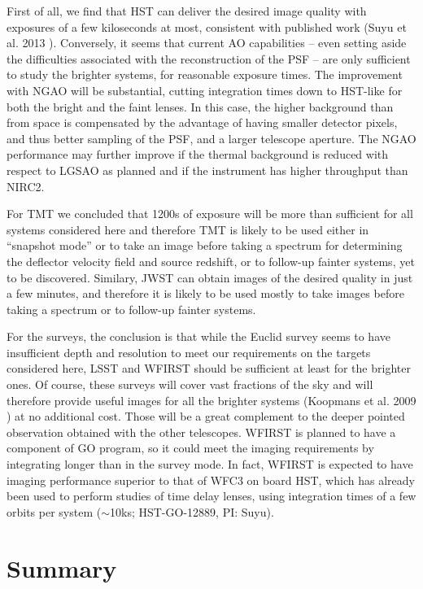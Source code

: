 \documentclass[a4paper,11pt]{article}
\begin{document}
{First of all, we find that HST can deliver the desired image quality
with exposures of a few kiloseconds at most, consistent with published work
(Suyu et al. 2013 \cite{2013ApJ...766...70S}). Conversely, it seems
that current AO capabilities -- even setting aside the difficulties
associated with the reconstruction of the PSF -- are only sufficient
to study the brighter systems, for reasonable exposure times. The
improvement with NGAO will be substantial, cutting integration times
down to HST-like for both the bright and the faint lenses. In this
case, the higher background than from space is compensated by the
advantage of having smaller detector pixels, and thus better sampling
of the PSF, and a larger telescope aperture. The NGAO performance may
further improve if the thermal background is reduced with respect to
LGSAO as planned and if the instrument has higher throughput than
NIRC2.

For TMT we concluded that 1200s of exposure will be more than
sufficient for all systems considered here and therefore TMT is likely
to be used either in ``snapshot mode'' or to take an image before taking
a spectrum for determining the deflector velocity field and source
redshift, or to follow-up fainter systems, yet to be
discovered. Similary, JWST can obtain images of the desired quality in
just a few minutes, and therefore it is likely to be used mostly to
take images before taking a spectrum or to follow-up fainter systems.

For the surveys, the conclusion is that while the Euclid survey seems
to have insufficient depth and resolution to meet our requirements on
the targets considered here, LSST and WFIRST should be sufficient at
least for the brighter ones. Of course, these surveys will cover vast
fractions of the sky and will therefore provide
useful images for all the brighter systems
(Koopmans et al. 2009 \cite{2009astro2010S.159K}) at no additional cost.
Those will be a great complement to the
deeper pointed observation obtained with the other telescopes. WFIRST
is planned to have a component of GO program, so it could meet the
imaging requirements by integrating longer than in the survey mode. In
fact, WFIRST is expected to have imaging performance superior to that
of WFC3 on board HST, which has already been used to perform studies
of time delay lenses, using integration times of a few orbits per
system ($\sim$10ks; HST-GO-12889, PI: Suyu).

\section{Summary}

}
\end{document}
